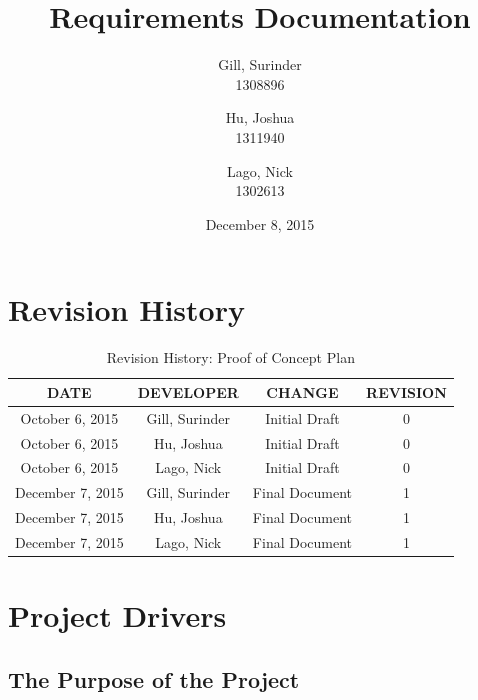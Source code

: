 \documentclass[11pt, oneside]{article}   	%
\title{Requirements Documentation}
\author{Gill, Surinder\\
		1308896
		\and
		Hu, Joshua\\
		1311940
		\and
		Lago, Nick\\
		1302613}
\date{December 8, 2015}							%
\begin{document}
\maketitle
\newpage
\tableofcontents
\listoffigures
\listoftables
\newpage

\section{Revision History}

\begin{table}[hp]
\caption{Revision History: Proof of Concept Plan}
\begin{center}
\label{tab:}
\begin{tabular}{|c|c|c|c|}
\hline
\textbf{DATE} & \textbf{DEVELOPER} & \textbf{CHANGE} & \textbf{REVISION}\\
\hline
October 6, 2015 & Gill, Surinder & Initial Draft & 0\\
\hline
October 6, 2015 & Hu, Joshua & Initial Draft & 0\\
\hline
October 6, 2015 & Lago, Nick & Initial Draft & 0\\
\hline
December 7, 2015 & Gill, Surinder & Final Document & 1\\
\hline
December 7, 2015 & Hu, Joshua & Final Document & 1\\
\hline
December 7, 2015 & Lago, Nick & Final Document & 1\\
\hline
\end{tabular}
\end{center}
\label{default}
\end{table}


\newpage
\section{Project Drivers}
\subsection{The Purpose of the Project}
\end{document}
